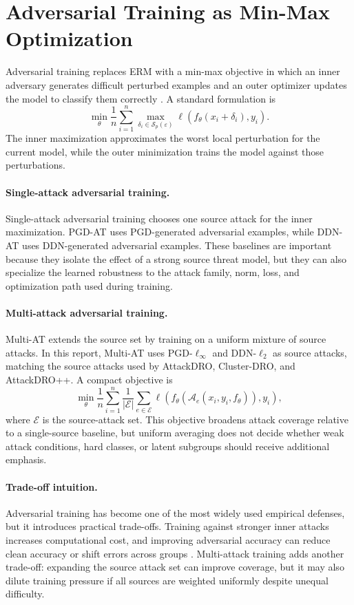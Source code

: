 \section{Adversarial Training as Min-Max Optimization}

Adversarial training replaces ERM with a min-max objective in which an inner adversary generates difficult perturbed examples and an outer optimizer updates the model to classify them correctly \cite{madry2019towards}. A standard formulation is
\[
\min_{\theta}
\frac{1}{n}\sum_{i=1}^{n}
\max_{\delta_i\in\mathcal{S}_p(\varepsilon)}
\ell(f_\theta(x_i+\delta_i),y_i).
\]
The inner maximization approximates the worst local perturbation for the current model, while the outer minimization trains the model against those perturbations.

\paragraph{Single-attack adversarial training.}
Single-attack adversarial training chooses one source attack for the inner maximization. PGD-AT uses PGD-generated adversarial examples, while DDN-AT uses DDN-generated adversarial examples. These baselines are important because they isolate the effect of a strong source threat model, but they can also specialize the learned robustness to the attack family, norm, loss, and optimization path used during training.

\paragraph{Multi-attack adversarial training.}
Multi-AT extends the source set by training on a uniform mixture of source attacks. In this report, Multi-AT uses PGD-$\ell_\infty$ and DDN-$\ell_2$ as source attacks, matching the source attacks used by AttackDRO, Cluster-DRO, and AttackDRO++. A compact objective is
\[
\min_{\theta}
\frac{1}{n}\sum_{i=1}^{n}
\frac{1}{|\mathcal{E}|}
\sum_{e\in\mathcal{E}}
\ell(f_\theta(\mathcal{A}_e(x_i,y_i,f_\theta)),y_i),
\]
where $\mathcal{E}$ is the source-attack set. This objective broadens attack coverage relative to a single-source baseline, but uniform averaging does not decide whether weak attack conditions, hard classes, or latent subgroups should receive additional emphasis.

\paragraph{Trade-off intuition.}
Adversarial training has become one of the most widely used empirical defenses, but it introduces practical trade-offs. Training against stronger inner attacks increases computational cost, and improving adversarial accuracy can reduce clean accuracy or shift errors across groups \cite{zhang2019trades,rice2020overfitting,zhao2024adversarialtraining}. Multi-attack training adds another trade-off: expanding the source attack set can improve coverage, but it may also dilute training pressure if all sources are weighted uniformly despite unequal difficulty.

